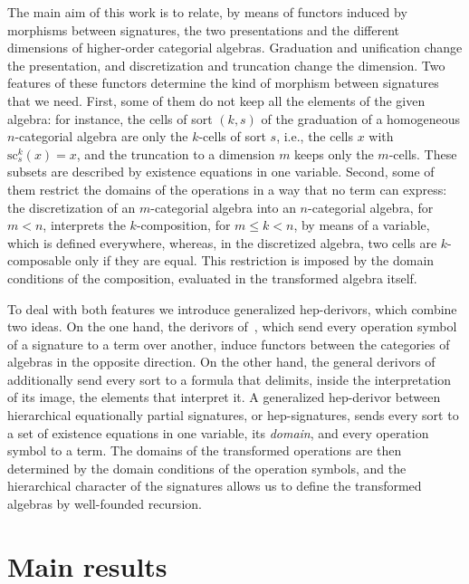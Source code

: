 \documentclass[a4paper, reqno]{amsbook}
\newcommand{\src}{\mathrm{sc}}
\theoremstyle{plain}
\theoremstyle{definition}
\begin{document}
The main aim of this work is to relate, by means of functors induced by morphisms between signatures, the two presentations and the different dimensions of higher-order categorial algebras.
Graduation and unification change the presentation, and discretization and truncation change the dimension.
Two features of these functors determine the kind of morphism between signatures that we need.
First, some of them do not keep all the elements of the given algebra: for instance, the cells of sort $(k,s)$ of the graduation of a homogeneous $n$-categorial algebra are only the $k$-cells of sort $s$, i.e., the cells $x$ with $\src^{k}_{s}(x)=x$, and the truncation to a dimension $m$ keeps only the $m$-cells.
These subsets are described by existence equations in one variable.
Second, some of them restrict the domains of the operations in a way that no term can express: the discretization of an $m$-categorial algebra into an $n$-categorial algebra, for $m<n$, interprets the $k$-composition, for $m\leq k<n$, by means of a variable, which is defined everywhere, whereas, in the discretized algebra, two cells are $k$-composable only if they are equal.
This restriction is imposed by the domain conditions of the composition, evaluated in the transformed algebra itself.

To deal with both features we introduce generalized hep-derivors, which combine two ideas.
On the one hand, the derivors of~\cite{ClimentSoliveres2010b}, which send every operation symbol of a signature to a term over another, induce functors between the categories of algebras in the opposite direction.
On the other hand, the general derivors of~\cite{LucasGutierrez2018} additionally send every sort to a formula that delimits, inside the interpretation of its image, the elements that interpret it.
A generalized hep-derivor between hierarchical equationally partial signatures, or hep-signatures, sends every sort to a set of existence equations in one variable, its \emph{domain}, and every operation symbol to a term.
The domains of the transformed operations are then determined by the domain conditions of the operation symbols, and the hierarchical character of the signatures allows us to define the transformed algebras by well-founded recursion.

\section{Main results}
\end{document}
